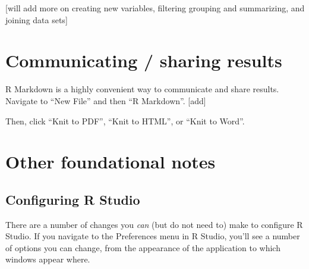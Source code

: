 \documentclass[]{book}
\newenvironment{Shaded}{\begin{snugshade}}{\end{snugshade}}
\newcommand{\KeywordTok}[1]{\textcolor[rgb]{0.13,0.29,0.53}{\textbf{#1}}}
\newcommand{\DataTypeTok}[1]{\textcolor[rgb]{0.13,0.29,0.53}{#1}}
\newcommand{\StringTok}[1]{\textcolor[rgb]{0.31,0.60,0.02}{#1}}
\newcommand{\CommentTok}[1]{\textcolor[rgb]{0.56,0.35,0.01}{\textit{#1}}}
\newcommand{\OperatorTok}[1]{\textcolor[rgb]{0.81,0.36,0.00}{\textbf{#1}}}
\newcommand{\NormalTok}[1]{#1}
\begin{document}
\begin{Shaded}
\end{Shaded}

{[}will add more on creating new variables, filtering grouping and
summarizing, and joining data sets{]}

\section{Communicating / sharing
results}\label{communicating-sharing-results}

R Markdown is a highly convenient way to communicate and share results.
Navigate to ``New File'' and then ``R Markdown''. {[}add{]}

Then, click ``Knit to PDF'', ``Knit to HTML'', or ``Knit to Word''.

\section{Other foundational notes}\label{other-foundational-notes}

\subsection{Configuring R Studio}\label{configuring-r-studio}

There are a number of changes you \emph{can} (but do not need to) make
to configure R Studio. If you navigate to the Preferences menu in R
Studio, you'll see a number of options you can change, from the
appearance of the application to which windows appear where.
\end{document}
